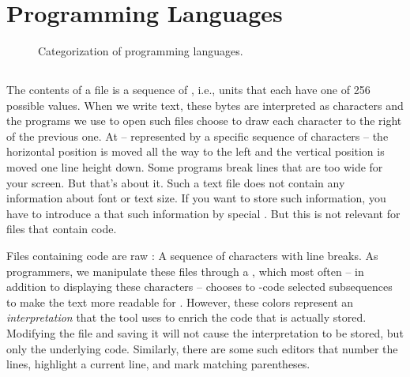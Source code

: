 \section{Programming Languages}
\label{sec:lang}

\begin{inspiration}{\cite{progLangJurassicPark}}
\end{inspiration}

\begin{figure}[tbp]
  
  \caption{Categorization of programming languages.}
  \label{fig:background:lang:categorization}
\end{figure}

\subsection{}

The contents of a file is a sequence of , i.e., units that each have one of 256 possible values. When we write text, these bytes are interpreted as characters and the programs we use to open such files choose to draw each character to the right of the previous one. At  -- represented by a specific sequence of characters -- the horizontal position is moved all the way to the left and the vertical position is moved one line height down. Some programs break lines that are too wide for your screen. But that's about it. Such a text file does not contain any information about font or text size. If you want to store such information, you have to introduce a  that  such information by special . But this is not relevant for files that contain code.

Files containing code are raw : A sequence of characters with line breaks. As programmers, we manipulate these files through a , which most often -- in addition to displaying these characters -- chooses to -code selected subsequences to make the text more readable for . However, these colors represent an \textsl{interpretation} that the tool uses to enrich the code that is actually stored. Modifying the file and saving it will not cause the interpretation to be stored, but only the underlying code. Similarly, there are some such editors that number the lines, highlight a current line, and mark matching parentheses.

